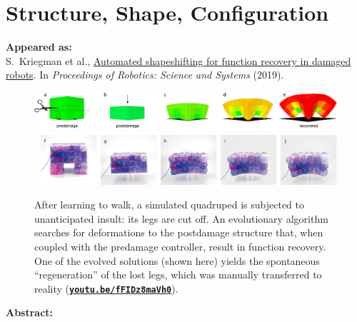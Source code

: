 
\chapter{Structure, Shape, Configuration}

\textbf{Appeared as:}\\
S.~Kriegman et al., 
\href{http://www.roboticsproceedings.org/rss15/p28.html}{\color{blue}Automated shapeshifting for function recovery in damaged robots}. 
In
\textit{Proceedings of Robotics: Science and Systems} (2019).

\vspace{0.5em}

\begin{figure}[!h]
    \centering
    \includegraphics[width=\linewidth]{Chapter05/fig/bigger_teaser.jpg} \\
    \includegraphics[trim={0 0 0 4pt},clip,width=\linewidth]{Chapter05/fig/VoxelBotCropped.jpg} \\
    \caption{After learning to walk, a simulated quadruped is subjected to unanticipated insult: its legs are cut off. 
    An evolutionary algorithm searches for deformations to the postdamage structure that, when coupled with the predamage controller, result in function recovery.
    One of the evolved solutions (shown here) yields the spontaneous ``regeneration'' of the lost legs, which was manually transferred to reality 
    (\href{https://youtu.be/fFIDz8maVh0}{\color{blue}\textbf{\texttt{youtu.be/fFIDz8maVh0}}}).
    } 
    \label{fig5:teaser}
\end{figure}

\noindent
\textbf{Abstract:}\\
\noindent












